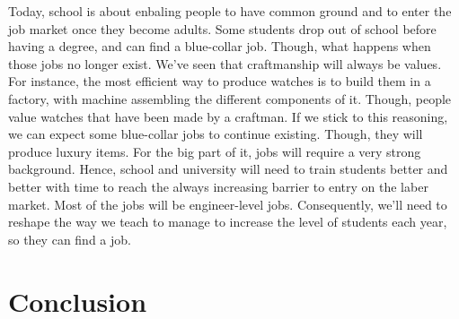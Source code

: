 \documentclass[12pt]{article}
\begin{document}
Today, school is about enbaling people to have common ground and to enter the
job market once they become adults. Some students drop out of school before
having a degree, and can find a blue-collar job. Though, what happens when those
jobs no longer exist.
We've seen that craftmanship will always be values. For instance, the most
efficient way to produce watches is to build them in a factory, with machine
assembling the different components of it. Though, people value watches that have
been made by a craftman. If we stick to this reasoning, we can expect some
blue-collar jobs to continue existing. Though, they will produce luxury items.
For the big part of it, jobs will require a very strong background. Hence,
school and university will need to train students better and better with time to
reach the always increasing barrier to entry on the laber market. Most of the
jobs will be engineer-level jobs.
Consequently, we'll need to reshape the way we teach to manage to increase the
level of students each year, so they can find a job.

\pagebreak


\section*{Conclusion}\label{conclusion}

\pagebreak

\printglossaries

\pagebreak
\end{document}
